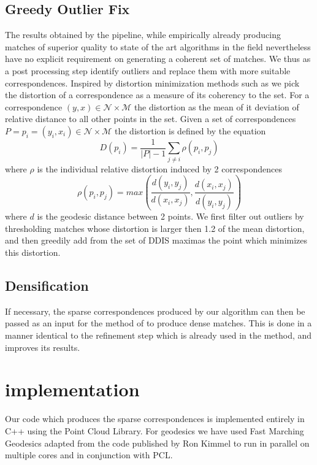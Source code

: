 \documentclass[10pt,twocolumn,letterpaper]{article}
\begin{document}
\subsection{Greedy Outlier Fix}
The results obtained by the pipeline, while empirically already producing matches of superior quality to state of the art algorithms in the field nevertheless have no explicit requirement on generating a coherent set of matches. We thus as a post processing step identify outliers and replace them with more suitable correspondences. 
Inspired by distortion minimization methods such as\cite{sahillioǧlu2011coarse} we pick the distortion of a correspondence as a measure of its coherency to the set. For a correspondence $(y,x)\in \mathcal{N}\times\mathcal{M}$ the distortion as the mean of it deviation of relative distance to all other points in the set. Given a set of correspondences $P={p_i=(y_i,x_i)\in \mathcal{N}\times\mathcal{M}}$ the distortion is defined by the equation
\begin{equation}
	D(p_i) = \frac{1}{|P|-1}\sum_{j \neq i}{\rho(p_i,p_j)}
\end{equation}
where $\rho$ is the individual relative distortion induced by 2 correspondences
\begin{equation}
\rho(p_i,p_j) = max(\frac{d(y_i,y_j)}{d(x_i,x_j)},\frac{d(x_i,x_j)}{d(y_i,y_j)})
\end{equation}
where $d$ is the geodesic distance between 2 points.
We first filter out outliers by thresholding matches whose distortion is larger then 1.2 of the mean distortion, and then greedily add from the set of DDIS maximas the point which minimizes this distortion.
\subsection{Densification}
If necessary, the sparse correspondences produced by our algorithm can then be passed as an input for the method of \cite{litany2017fully} to produce dense matches. This is done in a manner identical to the refinement step which is already used in the method, and improves its results.

\section{implementation}
Our code which produces the sparse correspondences is implemented entirely in C++ using the Point Cloud Library. For geodesics we have used  Fast Marching Geodesics adapted from the code published by Ron Kimmel to run in parallel on multiple cores and in conjunction with PCL.
\end{document}
